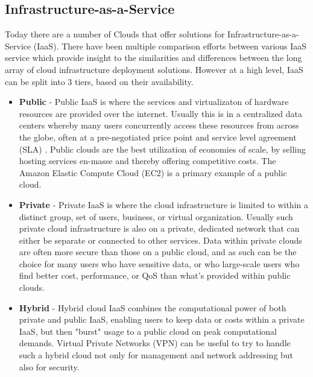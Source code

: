 \subsection{Infrastructure-as-a-Service}



Today there are a number of Clouds that offer solutions for Infrastructure-as-a-Service (IaaS).  There have been multiple comparison efforts between various IaaS service \cite{von2012comparison, aboveTheClouds, rimal2009taxonomy, sotomayorvirtual } which provide insight to the similarities and differences between the long array of cloud infrastructure deployment solutions.  However at a high level, IaaS can be split into 3 tiers, based on their availability.  

\begin{itemize}
\item \textbf{Public} - Public IaaS is where the services and virtualizaton of hardware resources are provided over the internet. Usually this is in a centralized data centers whereby many users concurrently access these resources from across the globe, often at a pre-negotiated price point and service level agreement (SLA) \cite{baset2012cloud}.  Public clouds are the best utilization of economies of scale, by selling hosting services en-masse and thereby offering competitive costs. The Amazon Elastic Compute Cloud (EC2) is a primary example of a public cloud.    

\item \textbf{Private} - Private IaaS is where the cloud infrastructure is limited to within a distinct group, set of users, business, or virtual organization. Usually such private cloud infrastructure is also on a private, dedicated network that can either be separate or connected to other services. Data within private clouds are often more secure than those on a public cloud, and as such can be the choice for many users who have sensitive data, or who large-scale users who find better cost, performance, or QoS than what's provided  within public clouds.

\item \textbf{Hybrid} - Hybrid cloud IaaS combines the computational power of both private and public IaaS, enabling users to keep data or costs within a private IaaS, but then "burst" usage to a public cloud on peak computational demands. Virtual Private Networks (VPN) can be useful to try to handle such a hybrid cloud not only for management and network addressing but also for security.  

\end{itemize}

